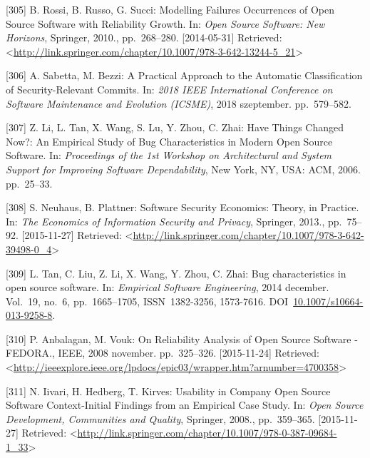\documentclass[12pt,magyar,a4paper,oneside]{scrreprt}
\newenvironment{cslreferences}%
  {}%
  {\par}
\begin{document}
\begin{cslreferences}
\leavevmode\hypertarget{ref-rossi_modelling_2010}{}%
{[}305{]} B. Rossi, B. Russo, G. Succi: Modelling Failures Occurrences
of Open Source Software with Reliability Growth. In: \emph{Open Source
Software: New Horizons}, Springer, 2010., pp.~268--280. {[}2014-05-31{]}
Retrieved:
\textless{}\url{http://link.springer.com/chapter/10.1007/978-3-642-13244-5_21}\textgreater{}

\leavevmode\hypertarget{ref-sabetta_practical_2018}{}%
{[}306{]} A. Sabetta, M. Bezzi: A Practical Approach to the Automatic
Classification of Security-Relevant Commits. In: \emph{2018 IEEE
International Conference on Software Maintenance and Evolution (ICSME)},
2018 szeptember. pp.~579--582.

\leavevmode\hypertarget{ref-li_have_2006}{}%
{[}307{]} Z. Li, L. Tan, X. Wang, S. Lu, Y. Zhou, C. Zhai: Have Things
Changed Now?: An Empirical Study of Bug Characteristics in Modern Open
Source Software. In: \emph{Proceedings of the 1st Workshop on
Architectural and System Support for Improving Software Dependability},
New York, NY, USA: ACM, 2006. pp.~25--33.

\leavevmode\hypertarget{ref-neuhaus_software_2013}{}%
{[}308{]} S. Neuhaus, B. Plattner: Software Security Economics: Theory,
in Practice. In: \emph{The Economics of Information Security and
Privacy}, Springer, 2013., pp.~75--92. {[}2015-11-27{]} Retrieved:
\textless{}\url{http://link.springer.com/chapter/10.1007/978-3-642-39498-0_4}\textgreater{}

\leavevmode\hypertarget{ref-tan_bug_2014}{}%
{[}309{]} L. Tan, C. Liu, Z. Li, X. Wang, Y. Zhou, C. Zhai: Bug
characteristics in open source software. In: \emph{Empirical Software
Engineering}, 2014 december. Vol.~19, no.~6, pp.~1665--1705,
ISSN~1382-3256, 1573-7616.
DOI~\href{https://doi.org/10.1007/s10664-013-9258-8}{10.1007/s10664-013-9258-8}.

\leavevmode\hypertarget{ref-anbalagan_reliability_2008}{}%
{[}310{]} P. Anbalagan, M. Vouk: On Reliability Analysis of Open Source
Software - FEDORA., IEEE, 2008 november. pp.~325--326. {[}2015-11-24{]}
Retrieved:
\textless{}\url{http://ieeexplore.ieee.org/lpdocs/epic03/wrapper.htm?arnumber=4700358}\textgreater{}

\leavevmode\hypertarget{ref-iivari_usability_2008}{}%
{[}311{]} N. Iivari, H. Hedberg, T. Kirves: Usability in Company Open
Source Software Context-Initial Findings from an Empirical Case Study.
In: \emph{Open Source Development, Communities and Quality}, Springer,
2008., pp.~359--365. {[}2015-11-27{]} Retrieved:
\textless{}\url{http://link.springer.com/chapter/10.1007/978-0-387-09684-1_33}\textgreater{}


\end{cslreferences}
\end{document}
